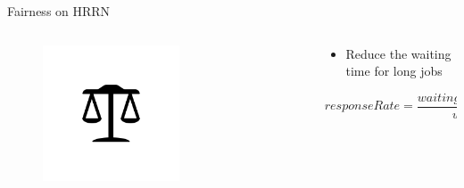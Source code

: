 \documentclass[10pt, compress, aspectratio=169]{beamer}
\begin{document}
\begin{frame}{Fairness on HRRN}

  \begin{columns}[T]
    \begin{column}{.4\textwidth}
      \begin{figure}[ht]
        \centering
        \includegraphics[width=0.6\textwidth, keepaspectratio=true]{images/fairness.png}
      \end{figure}
    \end{column}

    \hfill
    \begin{column}{.6\textwidth}
      \begin{itemize}
        \item Reduce the waiting time for long jobs
      \end{itemize}

      \begin{equation*}
         responseRate = \frac{waitingTime + wastTime}{waitingTime}
      \end{equation*}
    \end{column}
  \end{columns}

\end{frame}

\end{document}
